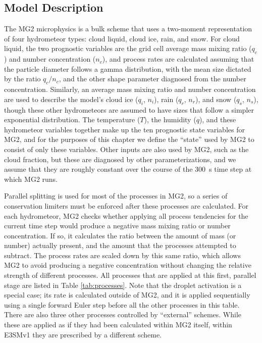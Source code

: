 \documentclass [11pt, proquest] {uwthesis}[2020/02/24]
\begin{document}
\subsection{Model Description}

The MG2 microphysics is a bulk scheme that uses a two‐moment representation of four hydrometeor types: cloud liquid, cloud ice, rain, and snow. For cloud liquid, the two prognostic variables are the grid cell average mass mixing ratio ($q_c$) and number concentration ($n_c$), and process rates are calculated assuming that the particle diameter follows a gamma distribution, with the mean size dictated by the ratio $q_c/n_c$, and the other shape parameter diagnosed from the number concentration. Similarly, an average mass mixing ratio and number concentration are used to describe the model's cloud ice ($q_i$, $n_i$), rain ($q_r$, $n_r$), and snow ($q_s$, $n_s$), though these other hydrometeors are assumed to have sizes that follow a simpler exponential distribution. The temperature ($T$), the humidity ($q$), and these hydrometeor variables together make up the ten prognostic state variables for MG2, and for the purposes of this chapter we define the ``state'' used by MG2 to consist of only these variables. Other inputs are also used by MG2, such as the cloud fraction, but these are diagnosed by other parameterizations, and we assume that they are roughly constant over the course of the \SI{300}{\second} time step at which MG2 runs.

Parallel splitting is used for most of the processes in MG2, so a series of conservation limiters must be enforced after these processes are calculated. For each hydrometeor, MG2 checks whether applying all process tendencies for the current time step would produce a negative mass mixing ratio or number concentration. If so, it calculates the ratio between the amount of mass (or number) actually present, and the amount that the processes attempted to subtract. The process rates are scaled down by this same ratio, which allows MG2 to avoid producing a negative concentration without changing the relative strength of different processes. All processes that are applied at this first, parallel stage are listed in Table \ref{tab:processes}. Note that the droplet activation is a special case; its rate is calculated outside of MG2, and it is applied sequentially using a single forward Euler step before all the other processes in this table. There are also three other processes controlled by ``external'' schemes. While these are applied as if they had been calculated within MG2 itself, within E3SMv1 they are prescribed by a different scheme.
\end{document}
